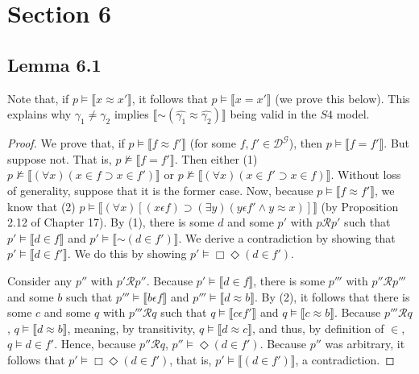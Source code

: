 \documentclass{article}
\newcommand*{\oldneg}{\mathord{\sim}}
\newcommand{\lbc}{\llbracket}
\newcommand{\rbc}{\rrbracket}
\theoremstyle{definition}
\begin{document}
\section*{Section 6}

\subsection*{Lemma 6.1}
Note that, if $p\vDash\lbc x\approx x'\rbc$, it follows that 
$p\vDash\lbc x=x'\rbc$ (we prove this below). This explains why $\gamma_1\ne\gamma_2$ implies 
$\lbc\oldneg(\hat{\gamma_1}\approx\hat{\gamma_2})\rbc$ being valid in the $S4$ model. 

\begin{proof}
We prove that, if $p\vDash\lbc f\approx f'\rbc$ (for some $f,f'\in\mathcal{D}^\mathcal{G}$), then 
$p\vDash\lbc f=f'\rbc$. But suppose not. That is, $p\nvDash\lbc f=f'\rbc$. Then either 
(1) $p\nvDash\lbc(\forall x)(x\in f\supset x\in f')\rbc$ or $p\nvDash\lbc(\forall x)(x\in f'\supset x\in f)\rbc$. Without 
loss of generality, suppose that it is the former case. Now, because $p\vDash\lbc f\approx f'\rbc$, we know that 
(2) $p\vDash\lbc(\forall x)[(x\epsilon f)\supset(\exists y)(y\epsilon f'\wedge y\approx x)]\rbc$ (by Proposition 2.12 
of Chapter 17). By (1), there is some $d$ and some $p'$ with $p\mathcal{R}p'$ such that
$p'\vDash\lbc d\in f\rbc$ and $p'\vDash\lbc\oldneg(d\in f')\rbc$. We derive a contradiction by showing that 
$p'\vDash\lbc d\in f'\rbc$. We do this by showing $p'\vDash\Box\Diamond(d\in f')$.

Consider any $p''$ with $p'\mathcal{R}p''$. Because $p'\vDash\lbc d\in f\rbc$, there is some 
$p'''$ with $p''\mathcal{R}p'''$ and some $b$ such that 
$p'''\vDash\lbc b\epsilon f\rbc$ and $p'''\vDash\lbc d\approx b\rbc$.
By (2), it follows that there is some $c$ and some $q$ with $p'''\mathcal{R}q$ such that 
$q\vDash\lbc c\epsilon f'\rbc$ and $q\vDash\lbc c\approx b\rbc$. Because $p'''\mathcal{R}q$, 
$q\vDash\lbc d\approx b\rbc$, meaning, by transitivity, 
$q\vDash\lbc d\approx c\rbc$, and thus, by definition of $\in$, $q\vDash d\in f'$. Hence, because 
$p''\mathcal{R}q$, $p''\vDash\Diamond(d\in f')$. Because $p''$ was arbitrary, it follows that
$p'\vDash\Box\Diamond(d\in f')$, that is, 
$p'\vDash\lbc(d\in f')\rbc$, a contradiction.
\end{proof}
\end{document}
